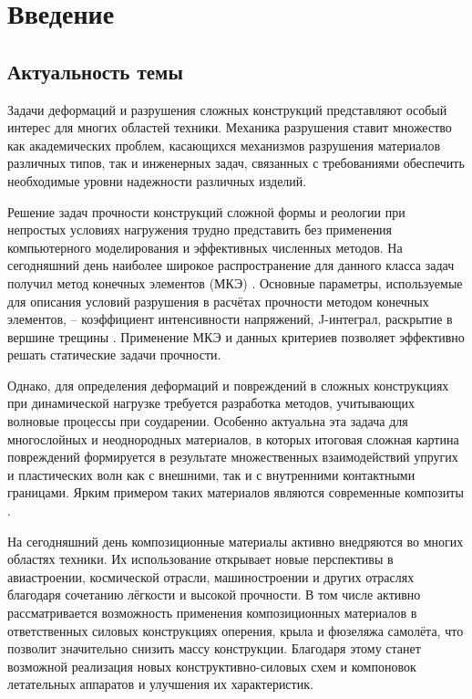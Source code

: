 \section*{Введение}

\subsection*{Актуальность темы}

Задачи деформаций и разрушения сложных конструкций представляют особый интерес для многих областей техники. Механика разрушения ставит множество как академических проблем, касающихся механизмов разрушения материалов различных типов, так и инженерных задач, связанных с требованиями обеспечить необходимые уровни надежности различных изделий.

Решение задач прочности конструкций сложной формы и реологии при непростых условиях нагружения трудно представить без применения компьютерного моделирования и эффективных численных методов. На сегодняшний день наиболее широкое распространение для данного класса задач получил метод конечных элементов (МКЭ) \cite{parton}. Основные параметры, используемые для описания условий разрушения в расчётах прочности методом конечных элементов, -- коэффициент интенсивности напряжений, J-интеграл, раскрытие в вершине трещины \cite{jp}. Применение МКЭ и данных критериев позволяет эффективно решать статические задачи прочности.

Однако, для определения деформаций и повреждений в сложных конструкциях при динамической нагрузке требуется разработка методов, учитывающих волновые процессы при соударении. Особенно актуальна эта задача для многослойных и неоднородных материалов, в которых итоговая сложная картина повреждений формируется в результате множественных взаимодействий упругих и пластических волн как с внешними, так и с внутренними контактными границами. Ярким примером таких материалов являются современные композиты \cite{bazhenov, mills}.

На сегодняшний день композиционные материалы активно внедряются во многих областях техники. Их использование открывает новые перспективы в авиастроении, космической отрасли, машиностроении и других отраслях благодаря сочетанию лёгкости и высокой прочности. В том числе активно рассматривается возможность применения композиционных материалов в ответственных силовых конструкциях оперения, крыла и фюзеляжа самолёта, что позволит значительно снизить массу конструкции. Благодаря этому станет возможной реализация новых конструктивно-силовых схем и компоновок летательных аппаратов и улучшения их характеристик.

